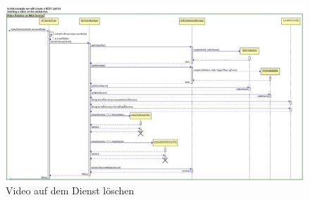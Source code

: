 \begin{figure}[ht]
	\centering
\includegraphics[width=1\textwidth]{./resources/Diagramme/Webservice/SeqVideoDeletion.jpg}
\caption{Video auf dem Dienst löschen}
	\label{fig:ServiceDel}
\end{figure}

